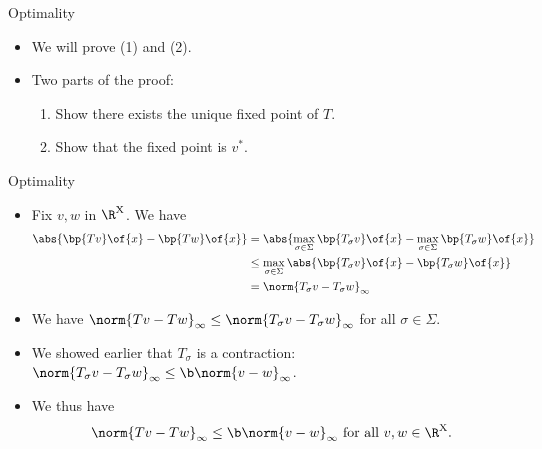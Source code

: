 \documentclass[11pt,xcolor={dvipsnames},aspectratio=159,hyperref={pdftex,pdfpagemode=UseNone,hidelinks,pdfdisplaydoctitle=true},usepdftitle=false]{beamer}
\begin{document}
\begin{frame}{Optimality}   
    \begin{itemize}
        \item We will prove (1) and (2). 
        \item Two parts of the proof:
        \begin{enumerate}
            \item Show there exists the unique fixed point of $T$.
            \item Show that the fixed point is $v^*$.
        \end{enumerate}
        \end{itemize}
    \end{frame}   

\begin{frame}{Optimality}   
    \begin{itemize}
        \item Fix $v, w$ in $\R^\text{X}$. We have \begin{align*}
            \abs{\bp{T v}\of{x} - \bp{T w}\of{x}} &= \abs{\max_{\sigma\in\Sigma} \bp{T_\sigma v }\of{x} - \max_{\sigma\in\Sigma} \bp{T_\sigma w }\of{x}} \\
            & \leq \max_{\sigma\in\Sigma} \abs{{\bp{T_\sigma v }}\of{x} - \bp{T_\sigma w }\of{x}} \\
            & = \norm{T_\sigma v-T_\sigma w}_\infty
        \end{align*}
        \item We have $\norm{Tv-Tw}_\infty \leq \norm{T_\sigma v-T_\sigma w}_\infty$ for all $\sigma \in \Sigma$.
        \item We showed earlier that $T_\sigma$ is a contraction: $\norm{T_\sigma v-T_\sigma w}_\infty \leq \b \norm{v-w}_\infty$.
        \item We thus have \begin{align*}
            \norm{Tv-Tw}_\infty \leq \b \norm{v-w}_\infty \text{ for all } v,w \in \R^\text{X}.
        \end{align*}

        \end{itemize}
    \end{frame}   
\end{document}
